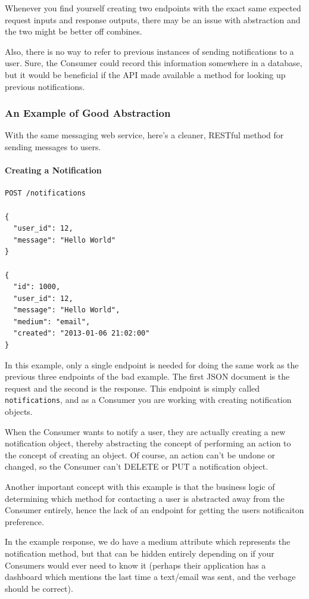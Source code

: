 \documentclass{book}
\begin{document}
Whenever you find yourself creating two endpoints with the exact same expected request inputs and response outputs, there may be an issue with abstraction and the two might be better off combines.

Also, there is no way to refer to previous instances of sending notifications to a user. Sure, the Consumer could record this information somewhere in a database, but it would be beneficial if the API made available a method for looking up previous notifications.

\subsubsection{An Example of Good Abstraction}

With the same messaging web service, here's a cleaner, RESTful method for sending messages to users.

\paragraph{\textbf{Creating a Notification}}

\begin{verbatim}
POST /notifications

{
  "user_id": 12,
  "message": "Hello World"
}

{
  "id": 1000,
  "user_id": 12,
  "message": "Hello World",
  "medium": "email",
  "created": "2013-01-06 21:02:00"
}
\end{verbatim}

In this example, only a single endpoint is needed for doing the same work as the previous three endpoints of the bad example. The first JSON document is the request and the second is the response. This endpoint is simply called \texttt{notifications}, and as a Consumer you are working with creating notification objects.

When the Consumer wants to notify a user, they are actually creating a new notification object, thereby abstracting the concept of performing an action to the concept of creating an object. Of course, an action can't be undone or changed, so the Consumer can't DELETE or PUT a notification object.

Another important concept with this example is that the business logic of determining which method for contacting a user is abstracted away from the Consumer entirely, hence the lack of an endpoint for getting the users notificaiton preference.

In the example response, we do have a medium attribute which represents the notification method, but that can be hidden entirely depending on if your Consumers would ever need to know it (perhaps their application has a dashboard which mentions the last time a text/email was sent, and the verbage should be correct).
\end{document}
